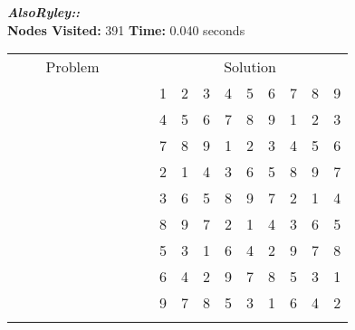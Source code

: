 \documentclass{article}
\begin{document}
\small\emph{\textbf{AlsoRyley::}}\\ \textbf{Nodes Visited:} 391 \textbf{Time:} 0.040 seconds\\
\begin{tabular}{||c|c|c||c|c|c||c|c|c|| c ||c|c|c||c|c|c||c|c|c||}
  \cmidrule{1-9} \cmidrule{11-19}
  \multicolumn{9}{|c|}{Problem} &                   & \multicolumn{9}{|c|}{Solution}   \\\cmidrule{1-9} \cmidrule{11-19} \morecmidrules \cmidrule{1-9} \cmidrule{11-19}
  &   &   &   &   &   &   &   &   &  & 1 & 2 & 3 & 4 & 5 & 6 & 7 & 8 & 9\\\cmidrule{1-9} \cmidrule{11-19}
  &   &   &   &   &   &   &   &   &  & 4 & 5 & 6 & 7 & 8 & 9 & 1 & 2 & 3\\\cmidrule{1-9} \cmidrule{11-19}
  &   &   &   &   &   &   &   &   &  & 7 & 8 & 9 & 1 & 2 & 3 & 4 & 5 & 6\\\cmidrule{1-9} \cmidrule{11-19} \morecmidrules \cmidrule{1-9} \cmidrule{11-19}
  &   &   &   &   &   &   &   &   &  & 2 & 1 & 4 & 3 & 6 & 5 & 8 & 9 & 7\\\cmidrule{1-9} \cmidrule{11-19}
  &   &   &   &   &   &   &   &   &  & 3 & 6 & 5 & 8 & 9 & 7 & 2 & 1 & 4\\\cmidrule{1-9} \cmidrule{11-19}
  &   &   &   &   &   &   &   &   &  & 8 & 9 & 7 & 2 & 1 & 4 & 3 & 6 & 5\\\cmidrule{1-9} \cmidrule{11-19} \morecmidrules \cmidrule{1-9} \cmidrule{11-19}
  &   &   &   &   &   &   &   &   &  & 5 & 3 & 1 & 6 & 4 & 2 & 9 & 7 & 8\\\cmidrule{1-9} \cmidrule{11-19}
  &   &   &   &   &   &   &   &   &  & 6 & 4 & 2 & 9 & 7 & 8 & 5 & 3 & 1\\\cmidrule{1-9} \cmidrule{11-19}
  &   &   &   &   &   &   &   &   &  & 9 & 7 & 8 & 5 & 3 & 1 & 6 & 4 & 2\\\cmidrule{1-9} \cmidrule{11-19} \morecmidrules \cmidrule{1-9} \cmidrule{11-19}

 \end{tabular}
\end{document}
